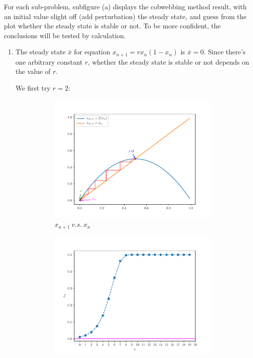 \begin{homeworkProblem}[2]
For each sub-problem, subfigure (a) displays the cobwebbing method result, with an initial value slight off (add perturbation) the steady state,
and guess from the plot whether the steady state is stable or not. To be more
confident, the conclusions will be tested by calculation.

\begin{enumerate}
\item The steady state $\bar x$ for equation $x_{n+1} = rx_n(1-x_n)$ is
$\bar x = 0$. Since there's one arbitrary constant $r$, whether the steady
state is stable or not depends on the value of $r$.

We first try $r=2$:
\begin{figure}[h]
    \centering
    \begin{subfigure}[t]{0.4\linewidth}
        \centering
        \includegraphics[scale=0.5]{fig/fig2(a)(1)_cob.pdf}
        \caption{$x_{n+1}\ v.s.\ x_n$}
    \end{subfigure}
    \hfill
    \begin{subfigure}[t]{0.4\linewidth}
        \centering
        \includegraphics[scale=0.5]{../fig/fig2(a)(1).pdf}

\end{subfigure}
\end{figure}
\end{enumerate}
\end{homeworkProblem}

